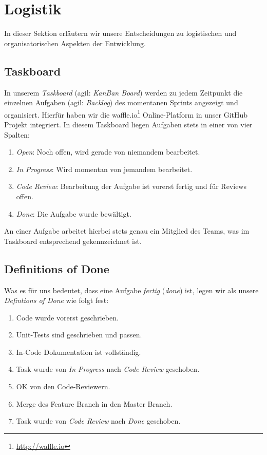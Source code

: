 \section{Logistik}

In dieser Sektion erläutern wir unsere Entscheidungen zu logistischen und
organisatorischen Aspekten der Entwicklung.

\subsection{Taskboard}

In unserem \emph{Taskboard} (agil: \emph{KanBan Board}) werden zu jedem
Zeitpunkt die einzelnen Aufgaben (agil: \emph{Backlog}) des momentanen Sprints
angezeigt und organisiert. Hierfür haben wir die
waffle.io\footnote{\url{http://waffle.io}} Online-Platform in unser GitHub
Projekt integriert. In diesem Taskboard liegen Aufgaben stets in einer von vier
Spalten:

\begin{enumerate}
  \item \emph{Open}: Noch offen, wird gerade von niemandem bearbeitet.
  \item \emph{In Progress}: Wird momentan von jemandem bearbeitet.
  \item \emph{Code Review}: Bearbeitung der Aufgabe ist vorerst fertig und für
    Reviews offen.
  \item \emph{Done}: Die Aufgabe wurde bewältigt.
\end{enumerate}

An einer Aufgabe arbeitet hierbei stets genau ein Mitglied des Teams, was im
Taskboard entsprechend gekennzeichnet ist.

\subsection{Definitions of Done}

Was es für uns bedeutet, dass eine Aufgabe \emph{fertig} (\emph{done}) ist,
legen wir als unsere \emph{Defintions of Done} wie folgt fest:

\begin{enumerate}
  \item Code wurde vorerst geschrieben.
  \item Unit-Tests sind geschrieben und passen.
  \item In-Code Dokumentation ist vollständig.
  \item Task wurde von \emph{In Progress} nach \emph{Code Review} geschoben.
  \item OK von den Code-Reviewern.
  \item Merge des Feature Branch in den Master Branch.
  \item Task wurde von \emph{Code Review} nach \emph{Done} geschoben.
\end{enumerate}

